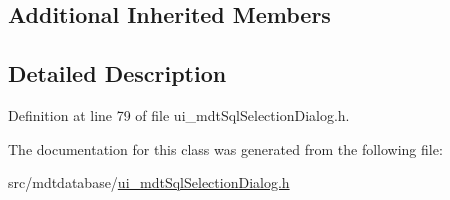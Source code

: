 \subsection*{Additional Inherited Members}


\subsection{Detailed Description}


Definition at line 79 of file ui\-\_\-mdt\-Sql\-Selection\-Dialog.\-h.



The documentation for this class was generated from the following file\-:\begin{DoxyCompactItemize}
\item 
src/mdtdatabase/\hyperlink{ui__mdt_sql_selection_dialog_8h}{ui\-\_\-mdt\-Sql\-Selection\-Dialog.\-h}\end{DoxyCompactItemize}

